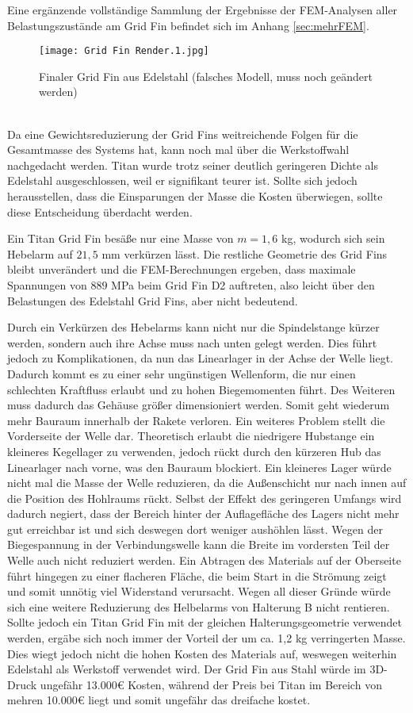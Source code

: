 Eine ergänzende vollständige Sammlung der Ergebnisse der FEM-Analysen aller Belastungszustände am Grid Fin befindet sich im Anhang \ref{sec:mehrFEM}.
\begin{figure}[h] 
	\centering
	\texttt{[image: Grid Fin Render.1.jpg]}
	\caption{Finaler Grid Fin aus Edelstahl (falsches Modell, muss noch geändert werden)}
	\label{abb_rendering1}
\end{figure}\\
Da eine Gewichtsreduzierung der Grid Fins weitreichende Folgen für die Gesamtmasse des Systems hat, kann noch mal über die Werkstoffwahl nachgedacht werden. Titan wurde trotz seiner deutlich geringeren Dichte als Edelstahl ausgeschlossen, weil er signifikant teurer ist. Sollte sich jedoch herausstellen, dass die Einsparungen der Masse die Kosten überwiegen, sollte diese Entscheidung überdacht werden.

Ein Titan Grid Fin besäße nur eine Masse von $m=1,6$ kg, wodurch sich sein Hebelarm auf $21,5$ mm verkürzen lässt. Die restliche Geometrie des Grid Fins bleibt unverändert und die FEM-Berechnungen ergeben, dass maximale Spannungen von $889$ MPa beim Grid Fin D2 auftreten, also leicht über den Belastungen des Edelstahl Grid Fins, aber nicht bedeutend.

Durch ein Verkürzen des Hebelarms kann nicht nur die Spindelstange kürzer werden, sondern auch ihre Achse muss nach unten gelegt werden. Dies führt jedoch zu Komplikationen, da nun das Linearlager in der Achse der Welle liegt. Dadurch kommt es zu einer sehr ungünstigen Wellenform, die nur einen schlechten Kraftfluss erlaubt und zu hohen Biegemomenten führt. Des Weiteren muss dadurch das Gehäuse größer dimensioniert werden. Somit geht wiederum mehr Bauraum innerhalb der Rakete verloren. Ein weiteres Problem stellt die Vorderseite der Welle dar. Theoretisch erlaubt die niedrigere Hubstange ein kleineres Kegellager zu verwenden, jedoch rückt durch den kürzeren Hub das Linearlager nach vorne, was den Bauraum blockiert. Ein kleineres Lager würde nicht mal die Masse der Welle reduzieren, da die Außenschicht nur nach innen auf die Position des Hohlraums rückt. Selbst der Effekt des geringeren Umfangs wird dadurch negiert, dass der Bereich hinter der Auflagefläche des Lagers nicht mehr gut erreichbar ist und sich deswegen dort weniger aushöhlen lässt. Wegen der Biegespannung in der Verbindungswelle kann die Breite im vordersten Teil der Welle auch nicht reduziert werden. Ein Abtragen des Materials auf der Oberseite führt hingegen zu einer flacheren Fläche, die beim Start in die Strömung zeigt und somit unnötig viel Widerstand verursacht. Wegen all dieser Gründe würde sich eine weitere Reduzierung des Helbelarms von Halterung B nicht rentieren. Sollte jedoch ein Titan Grid Fin mit der gleichen Halterungsgeometrie verwendet werden, ergäbe sich noch immer der Vorteil der um ca. 1,2 kg verringerten Masse. Dies wiegt jedoch nicht die hohen Kosten des Materials auf, weswegen weiterhin Edelstahl als Werkstoff verwendet wird. Der Grid Fin aus Stahl würde im 3D-Druck ungefähr 13.000€ Kosten, während der Preis bei Titan im Bereich von mehren 10.000€ liegt und somit ungefähr das dreifache kostet.
